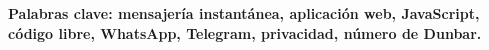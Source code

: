 \begin{comment}

Instant messaging applications are a major component of interpersonal communications; even more so for people who do not see each other on a day-to-day basis. In October 2020, WhatsApp reported sending about 200 billion messages per day and, as of today, it has more than 2 billion users.

In 1992, Robin Dunbar approximated the number of people who can fully relate to each other in a system by 150, relating it to the size of the brain's neocortex and its processing capacity. Knowing the objective state of personal relationships with our circles can be of vital importance for the maintenance, preservation and improvement of strong, lasting and healthy relationships.

The main objective of this project is to provide the user with a tool that offers this objective data in a visual and easily understandable way, allowing its analysis and subsequent action accordingly.

The human being generates and collects more and more data in the digital era. With the growth of this trend, users are increasingly aware of the value of their data and the use that can be made of it in the wrong hands. Privacy is a major concern in the realm of personal conversations, and it has been considered a primary concern during the development of this application. To protect user data, the entire application is sent to the client, and all necessary operations are executed on the client's device. Additionally, the application is open-source, and the code is freely accessible for reading and modification by users and contributors under the \acrfull{gplv3} license.\cite{GPLv3} The application is built using React.

Overall, this project presents the design and implementation of a web application that allows users to analyze their WhatsApp chats and gain insights into their social interactions and relationships, all while ensuring data privacy and accessibility under an open-source license. It is called \textit{ChatStats}.

Debido a la importancia de la privacidad de los datos en el ámbito de las conversaciones personales, se ha tenido en cuenta durante el desarrollo del proyecto como principal preocupación para la arquitectura.

Por ello se ha desarrollado una aplicación web que se envía al cliente en su totalidad para que todas las operaciones necesarias se ejecuten en su dispositivo. Además, todo el código es de acceso libre para lectura y modificación de usuarios y contribuyentes, categorizando el proyecto como \textit{software} libre y gratuito bajo la licencia \acrfull{gplv3}. \cite{GPLv3}
 
\end{comment}


\vfill
\textbf{Palabras clave: mensajería instantánea, aplicación web, JavaScript, código libre, WhatsApp, Telegram, privacidad, número de Dunbar.} 